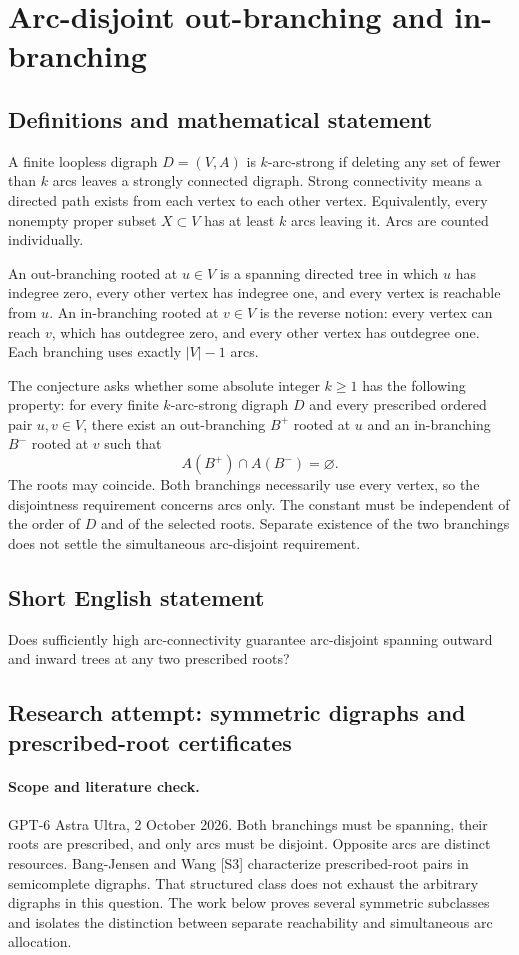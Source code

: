 \documentclass[11pt,a4paper]{article}
\begin{document}
\section*{Arc-disjoint out-branching and in-branching}\label{statement}

\subsection{Definitions and mathematical statement}
A finite loopless digraph $D=(V,A)$ is $k$-arc-strong if deleting any set
of fewer than $k$ arcs leaves a strongly connected digraph. Strong
connectivity means a directed path exists from each vertex to each
other vertex. Equivalently, every nonempty proper subset $X\subset V$
has at least $k$ arcs leaving it. Arcs are counted individually.

An out-branching rooted at $u\in V$ is a spanning directed tree in which
$u$ has indegree zero, every other vertex has indegree one, and every
vertex is reachable from $u$. An in-branching rooted at $v\in V$ is the
reverse notion: every vertex can reach $v$, which has outdegree zero,
and every other vertex has outdegree one. Each branching uses exactly
$|V|-1$ arcs.

The conjecture asks whether some absolute integer $k\ge1$ has the
following property: for every finite $k$-arc-strong digraph $D$ and every
prescribed ordered pair $u,v\in V$, there exist an out-branching $B^+$
rooted at $u$ and an in-branching $B^-$ rooted at $v$ such that
\[
                              A(B^+)\cap A(B^-)=\varnothing.
\]
The roots may coincide. Both branchings necessarily use every vertex,
so the disjointness requirement concerns arcs only. The constant must
be independent of the order of $D$ and of the selected roots. Separate
existence of the two branchings does not settle the simultaneous
arc-disjoint requirement.
\subsection{Short English statement}
Does sufficiently high arc-connectivity guarantee arc-disjoint spanning outward and inward trees at any two prescribed roots?
\subsection{Research attempt: symmetric digraphs and prescribed-root certificates}
\paragraph{Scope and literature check.}
GPT-6 Astra Ultra, 2 October 2026. Both branchings must be spanning,
their roots are prescribed, and only arcs must be disjoint. Opposite
arcs are distinct resources. Bang-Jensen and Wang [S3] characterize
prescribed-root pairs in semicomplete digraphs. That structured class
does not exhaust the arbitrary digraphs in this question. The work
below proves several symmetric subclasses and isolates the distinction
between separate reachability and simultaneous arc allocation.
\end{document}
